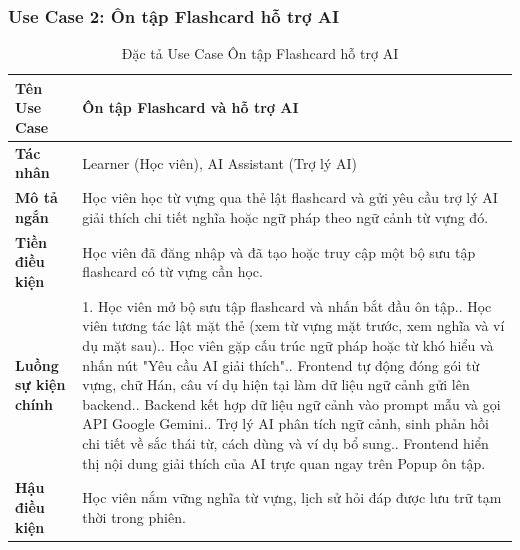 \documentclass[../DoAn.tex]{subfiles}
\begin{document}
\subsubsection*{Use Case 2: Ôn tập Flashcard hỗ trợ AI}
\begin{table}[H]
\centering
\small
\renewcommand{\arraystretch}{1.2}


\begin{tabular}{|p{3.5cm}|p{11.0cm}|}
\hline
\textbf{Tên Use Case} & Ôn tập Flashcard và hỗ trợ AI \\
\hline
\textbf{Tác nhân} & Learner (Học viên), AI Assistant (Trợ lý AI) \\
\hline
\textbf{Mô tả ngắn} & Học viên học từ vựng qua thẻ lật flashcard và gửi yêu cầu trợ lý AI giải thích chi tiết nghĩa hoặc ngữ pháp theo ngữ cảnh từ vựng đó. \\
\hline
\textbf{Tiền điều kiện} & Học viên đã đăng nhập và đã tạo hoặc truy cập một bộ sưu tập flashcard có từ vựng cần học. \\
\hline
\textbf{Luồng sự kiện chính} & 
1. Học viên mở bộ sưu tập flashcard và nhấn bắt đầu ôn tập.\newline
2. Học viên tương tác lật mặt thẻ (xem từ vựng mặt trước, xem nghĩa và ví dụ mặt sau).\newline
3. Học viên gặp cấu trúc ngữ pháp hoặc từ khó hiểu và nhấn nút "Yêu cầu AI giải thích".\newline
4. Frontend tự động đóng gói từ vựng, chữ Hán, câu ví dụ hiện tại làm dữ liệu ngữ cảnh gửi lên backend.\newline
5. Backend kết hợp dữ liệu ngữ cảnh vào prompt mẫu và gọi API Google Gemini.\newline
6. Trợ lý AI phân tích ngữ cảnh, sinh phản hồi chi tiết về sắc thái từ, cách dùng và ví dụ bổ sung.\newline
7. Frontend hiển thị nội dung giải thích của AI trực quan ngay trên Popup ôn tập. \\
\hline
\textbf{Hậu điều kiện} & Học viên nắm vững nghĩa từ vựng, lịch sử hỏi đáp được lưu trữ tạm thời trong phiên. \\
\hline
\end{tabular}
\caption{Đặc tả Use Case Ôn tập Flashcard hỗ trợ AI}
\label{tab:spec_flashcard_ai}
\end{table}
\end{document}
